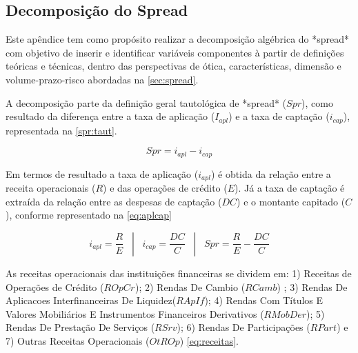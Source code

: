 \documentclass[
  12pt,
  12pt,
  openright,
  oneside,
  a4paper,
  chapter=TITLE,
  section=TITLE,
  subsection=TITLE,
  subsubsection=TITLE,
  portugues,
  sumario=tradicional]{abntex2}
\begin{document}
\begin{apendicesenv}

\vspace{-10mm}

\renewcommand{\thechapter}{\arabic{chapter}}

\chapter{Decomposição do Spread}\label{apendicea}

Este apêndice tem como propósito realizar a decomposição algébrica do *spread* com objetivo de inserir e identificar variáveis componentes à partir de definições teóricas e técnicas, dentro das perspectivas de ótica, características, dimensão e volume-prazo-risco abordadas na \autoref{sec:spread}.

A decomposição parte da definição geral tautológica de *spread* ($Spr$), como resultado da diferença entre a taxa de aplicação ($I_{apl}$) e a taxa de captação ($i_{cap}$), representada na \autoref{spr:taut}.



\begin{equation}\label{spr:taut}
Spr = i_{apl} - i_{cap}
\end{equation}



Em termos de resultado a taxa de aplicação ($i_{apl}$) é obtida da relação entre a receita operacionais ($R$) e das operações de crédito ($E$). Já a taxa de captação é extraída da relação entre as despesas de captação ($DC$) e o montante capitado ($C$), conforme representado na \autoref{eq:aplcap}


\begin{equation}\label{eq:aplcap}
i_{apl} = \frac{R}{E}  \hspace{10pt} |  \hspace{10pt} i_{cap} =  \frac{DC}{C}  \hspace{10pt} |  \hspace{10pt} Spr =  \frac{R_{}}{E} -  \frac{DC}{C}
\end{equation}


As receitas operacionais das instituições financeiras se dividem em: 1) Receitas de Operações de Crédito ($ROpCr_{}$); 2) Rendas De Cambio ($RCamb$) ; 3) Rendas De Aplicacoes Interfinanceiras De Liquidez($RApIf$); 4) Rendas Com Títulos E Valores Mobiliários E Instrumentos Financeiros Derivativos ($RMobDer$); 5) Rendas De Prestação De Serviços ($RSrv$); 6) Rendas De Participações ($RPart$) e 7) Outras Receitas Operacionais ($OtROp$) \autoref{eq:receitas}.



\end{apendicesenv}
\end{document}
